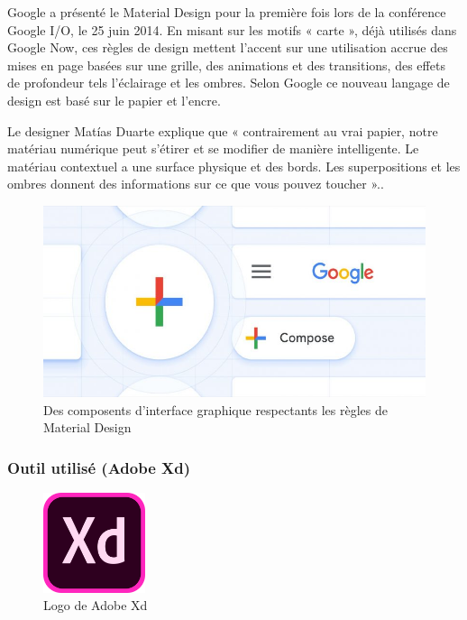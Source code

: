 Google a présenté le Material Design pour la première fois lors de la conférence Google I/O, le 25 juin 2014. En misant sur les motifs « carte », déjà utilisés dans Google Now, ces règles de design mettent l'accent sur une utilisation accrue des mises en page basées sur une grille, des animations et des transitions, des effets de profondeur tels l'éclairage et les ombres. Selon Google ce nouveau langage de design est basé sur le papier et l'encre.

Le designer Matías Duarte explique que « contrairement au vrai papier, notre matériau numérique peut s'étirer et se modifier de manière intelligente. Le matériau contextuel a une surface physique et des bords. Les superpositions et les ombres donnent des informations sur ce que vous pouvez toucher ».\cite{noauthor_material_2018}.

\begin{figure}[H]
	\centering
		\includegraphics[width=14cm]{Images/chapter3/material_design.jpg}
		\caption{{\footnotesize Des composents d'interface graphique respectants les règles de Material Design}}
\end{figure}

\subsubsection{Outil utilisé (Adobe Xd)}

\begin{figure}
	\vspace{-10pt}
	\includegraphics[width=3cm]{Images/chapter3/adobe_xd_logo.png}
	\vspace{-10pt}
	\caption{{\footnotesize Logo de Adobe Xd}}
\end{figure}

